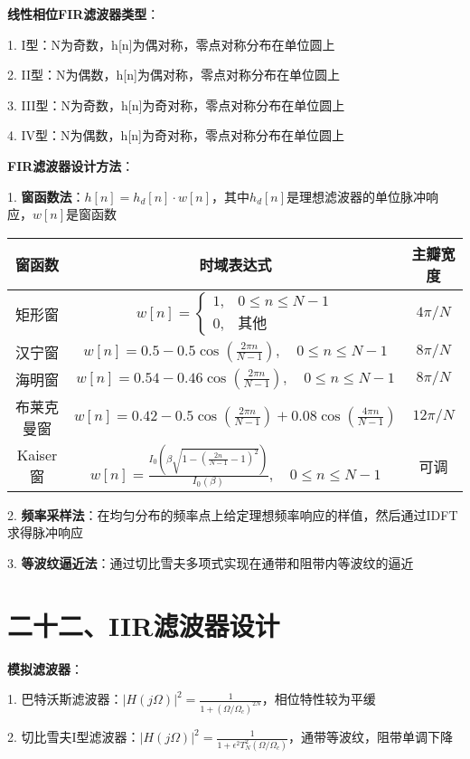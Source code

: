 \textbf{线性相位FIR滤波器类型}：

1. I型：N为奇数，h[n]为偶对称，零点对称分布在单位圆上

2. II型：N为偶数，h[n]为偶对称，零点对称分布在单位圆上

3. III型：N为奇数，h[n]为奇对称，零点对称分布在单位圆上

4. IV型：N为偶数，h[n]为奇对称，零点对称分布在单位圆上

\textbf{FIR滤波器设计方法}：

1. \textbf{窗函数法}：$h[n] = h_d[n] \cdot w[n]$，其中$h_d[n]$是理想滤波器的单位脉冲响应，$w[n]$是窗函数

\begin{tabular}{c|c|c}
	窗函数 & 时域表达式 & 主瓣宽度 \\
	\hline
	矩形窗 & $w[n] = \begin{cases} 
		1, & 0 \leq n \leq N-1 \\ 
		0, & \text{其他} 
	\end{cases}$ & $4\pi/N$ \\
	\hline
	汉宁窗 & $w[n] = 0.5 - 0.5\cos\left(\frac{2\pi n}{N-1}\right), \quad 0 \leq n \leq N-1$ & $8\pi/N$ \\
	\hline
	海明窗 & $w[n] = 0.54 - 0.46\cos\left(\frac{2\pi n}{N-1}\right), \quad 0 \leq n \leq N-1$ & $8\pi/N$ \\
	\hline
	布莱克曼窗 & $w[n] = 0.42 - 0.5\cos\left(\frac{2\pi n}{N-1}\right) + 0.08\cos\left(\frac{4\pi n}{N-1}\right)$ & $12\pi/N$ \\
	\hline
	Kaiser窗 & $w[n] = \frac{I_0\left(\beta\sqrt{1-\left(\frac{2n}{N-1}-1\right)^2}\right)}{I_0(\beta)}, \quad 0 \leq n \leq N-1$ & 可调 \\
\end{tabular}

2. \textbf{频率采样法}：在均匀分布的频率点上给定理想频率响应的样值，然后通过IDFT求得脉冲响应

3. \textbf{等波纹逼近法}：通过切比雪夫多项式实现在通带和阻带内等波纹的逼近

\section*{二十二、IIR滤波器设计}

\textbf{模拟滤波器}：

1. 巴特沃斯滤波器：$|H(j\Omega)|^2 = \frac{1}{1+(\Omega/\Omega_c)^{2N}}$，相位特性较为平缓

2. 切比雪夫I型滤波器：$|H(j\Omega)|^2 = \frac{1}{1+\epsilon^2T_N^2(\Omega/\Omega_c)}$，通带等波纹，阻带单调下降

